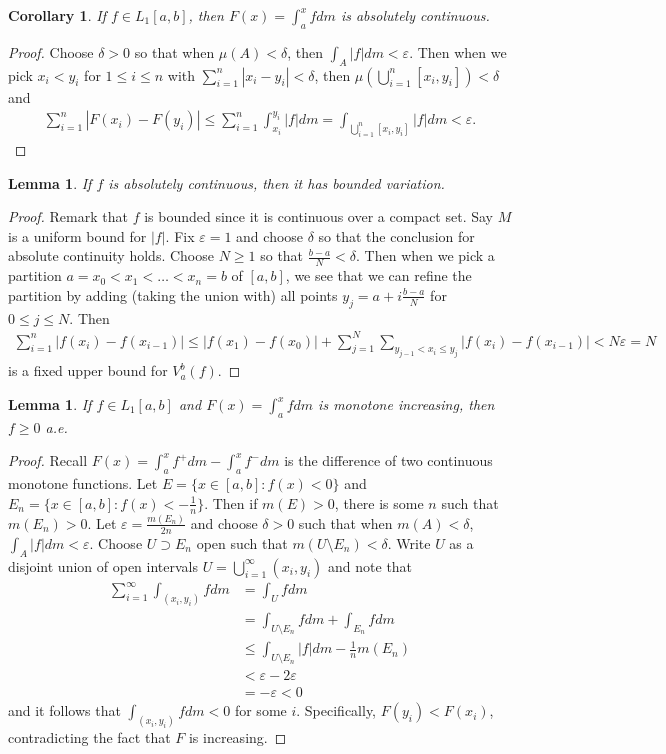 \documentclass[11pt]{amsart}
\newtheorem{lemma}[theorem]{Lemma}
\newtheorem{corollary}[theorem]{Corollary}
\theoremstyle{definition}
\numberwithin{equation}{section}
\begin{document}
\begin{corollary}\label{l1-abs-cts}
    If $f\in L_1[a,b]$, then $F(x)=\int_a^xfdm$ is absolutely continuous.
\end{corollary}
\begin{proof}
    Choose $\delta>0$ so that when $\mu(A)<\delta$, then $\int_A|f|dm<\varepsilon$. Then when we pick $x_i<y_i$ for $1\le i\le n$ with $\sum_{i=1}^n|x_i-y_i|<\delta$, then $\mu(\bigcup_{i=1}^n[x_i,y_i])<\delta$ and 
    \begin{align*}
        \sum_{i=1}^n|F(x_i)-F(y_i)|\le\sum_{i=1}^n\int_{x_i}^{y_i}|f|dm=\int_{\bigcup_{i=1}^n[x_i,y_i]}|f|dm<\varepsilon.
    \end{align*}
\end{proof}
\begin{lemma}
    If $f$ is absolutely continuous, then it has bounded variation.
\end{lemma}
\begin{proof}
    Remark that $f$ is bounded since it is continuous over a compact set. Say $M$ is a uniform bound for $|f|$. Fix $\varepsilon=1$ and choose $\delta$ so that the conclusion for absolute continuity holds. Choose $N\ge 1$ so that $\frac{b-a}{N}<\delta$. Then when we pick a partition $a=x_0<x_1<\ldots <x_n=b$ of $[a,b]$, we see that we can refine the partition by adding (taking the union with) all points $y_j=a+i\frac{b-a}{N}$ for $0\le j\le N$. Then
    \begin{align*}
        \sum_{i=1}^n|f(x_i)-f(x_{i-1})|\le |f(x_1)-f(x_0)|+\sum_{j=1}^N\sum_{y_{j-1}< x_i\le y_j}|f(x_i)-f(x_{i-1})|<N\varepsilon=N
    \end{align*}
    is a fixed upper bound for $V_a^b(f)$.
\end{proof}
\begin{lemma}
    If $f\in L_1[a,b]$ and $F(x)=\int_a^xfdm$ is monotone increasing, then $f\ge 0$ a.e.
\end{lemma}
\begin{proof}
    Recall $F(x)=\int_a^xf^+dm-\int_a^xf^-dm$ is the difference of two continuous monotone functions. Let $E=\{x\in [a,b]:f(x)<0\}$ and $E_n=\{x\in [a,b]:f(x)<-\frac{1}{n}\}$. Then if $m(E)>0$, there is some $n$ such that $m(E_n)>0$. Let $\varepsilon=\frac{m(E_n)}{2n}$ and choose $\delta>0$ such that when $m(A)<\delta$, $\int_A|f|dm<\varepsilon$. Choose $U\supset E_n$ open such that $m(U\setminus E_n)<\delta$. Write $U$ as a disjoint union of open intervals $U=\bigcup_{i=1}^\infty(x_i,y_i)$ and note that 
    \begin{align*}
        \sum_{i=1}^\infty\int_{(x_i,y_i)}fdm&=\int_Ufdm\\
        &=\int_{U\setminus E_n}fdm+\int_{E_n}fdm\\
        &\le \int_{U\setminus E_n}|f|dm-\frac{1}{n}m(E_n)\\
        &<\varepsilon-2\varepsilon\\
        &=-\varepsilon<0
    \end{align*}
    and it follows that $\int_{(x_i,y_i)}fdm<0$ for some $i$. Specifically, $F(y_i)<F(x_i)$, contradicting the fact that $F$ is increasing.
\end{proof}
\end{document}
